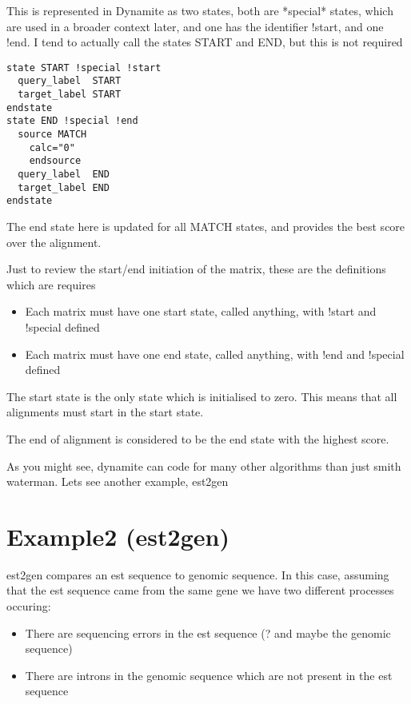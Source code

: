 This is represented in Dynamite as two states, both are *special*
states, which are used in a broader context later, and one has the
identifier !start, and one !end.  I tend to actually call the states
START and END, but this is not required

\begin{verbatim}
state START !special !start
  query_label  START
  target_label START
endstate
state END !special !end
  source MATCH 
    calc="0"
    endsource
  query_label  END
  target_label END
endstate
\end{verbatim}


The end state here is updated for all MATCH states, and provides the best score
over the alignment. 

Just to review the start/end initiation of the matrix, these are the
definitions which are requires

\begin{itemize}
\item Each matrix must have one start state, called anything, with
!start and !special defined
\item Each matrix must have one end state, called anything, with !end
and !special defined
\end{itemize}

The start state is the only state which is initialised to zero. This
means that all alignments must start in the start state.

The end of alignment is considered to be the end state with the highest score. 


As you might see, dynamite can code for many other algorithms than just 
smith waterman. Lets see another example, est2gen

\section{Example2 (est2gen)}

est2gen compares an est sequence to genomic sequence. In this case,
assuming that the est sequence came from the same gene we have two
different processes occuring:

\begin{itemize}
\item There are sequencing errors in the est sequence (? and maybe the genomic sequence)
\item There are introns in the genomic sequence which are not present in the est sequence
\end{itemize}

